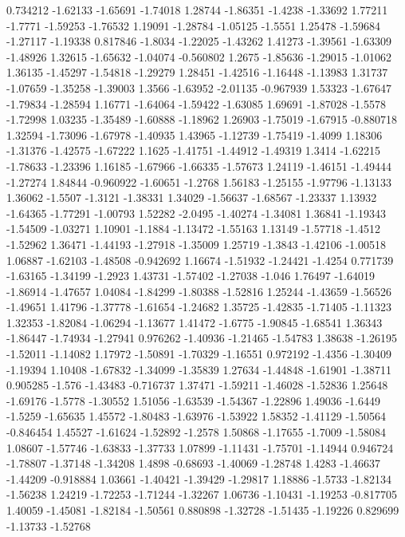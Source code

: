 \documentclass[9pt]{article}
\theoremstyle{plain}
\theoremstyle{definition}
\theoremstyle{remark}
\numberwithin{equation}{section}
\begin{document}
0.734212
-1.62133
-1.65691
-1.74018
1.28744
-1.86351
-1.4238
-1.33692
1.77211
-1.7771
-1.59253
-1.76532
1.19091
-1.28784
-1.05125
-1.5551
1.25478
-1.59684
-1.27117
-1.19338
0.817846
-1.8034
-1.22025
-1.43262
1.41273
-1.39561
-1.63309
-1.48926
1.32615
-1.65632
-1.04074
-0.560802
1.2675
-1.85636
-1.29015
-1.01062
1.36135
-1.45297
-1.54818
-1.29279
1.28451
-1.42516
-1.16448
-1.13983
1.31737
-1.07659
-1.35258
-1.39003
1.3566
-1.63952
-2.01135
-0.967939
1.53323
-1.67647
-1.79834
-1.28594
1.16771
-1.64064
-1.59422
-1.63085
1.69691
-1.87028
-1.5578
-1.72998
1.03235
-1.35489
-1.60888
-1.18962
1.26903
-1.75019
-1.67915
-0.880718
1.32594
-1.73096
-1.67978
-1.40935
1.43965
-1.12739
-1.75419
-1.4099
1.18306
-1.31376
-1.42575
-1.67222
1.1625
-1.41751
-1.44912
-1.49319
1.3414
-1.62215
-1.78633
-1.23396
1.16185
-1.67966
-1.66335
-1.57673
1.24119
-1.46151
-1.49444
-1.27274
1.84844
-0.960922
-1.60651
-1.2768
1.56183
-1.25155
-1.97796
-1.13133
1.36062
-1.5507
-1.3121
-1.38331
1.34029
-1.56637
-1.68567
-1.23337
1.13932
-1.64365
-1.77291
-1.00793
1.52282
-2.0495
-1.40274
-1.34081
1.36841
-1.19343
-1.54509
-1.03271
1.10901
-1.1884
-1.13472
-1.55163
1.13149
-1.57718
-1.4512
-1.52962
1.36471
-1.44193
-1.27918
-1.35009
1.25719
-1.3843
-1.42106
-1.00518
1.06887
-1.62103
-1.48508
-0.942692
1.16674
-1.51932
-1.24421
-1.4254
0.771739
-1.63165
-1.34199
-1.2923
1.43731
-1.57402
-1.27038
-1.046
1.76497
-1.64019
-1.86914
-1.47657
1.04084
-1.84299
-1.80388
-1.52816
1.25244
-1.43659
-1.56526
-1.49651
1.41796
-1.37778
-1.61654
-1.24682
1.35725
-1.42835
-1.71405
-1.11323
1.32353
-1.82084
-1.06294
-1.13677
1.41472
-1.6775
-1.90845
-1.68541
1.36343
-1.86447
-1.74934
-1.27941
0.976262
-1.40936
-1.21465
-1.54783
1.38638
-1.26195
-1.52011
-1.14082
1.17972
-1.50891
-1.70329
-1.16551
0.972192
-1.4356
-1.30409
-1.19394
1.10408
-1.67832
-1.34099
-1.35839
1.27634
-1.44848
-1.61901
-1.38711
0.905285
-1.576
-1.43483
-0.716737
1.37471
-1.59211
-1.46028
-1.52836
1.25648
-1.69176
-1.5778
-1.30552
1.51056
-1.63539
-1.54367
-1.22896
1.49036
-1.6449
-1.5259
-1.65635
1.45572
-1.80483
-1.63976
-1.53922
1.58352
-1.41129
-1.50564
-0.846454
1.45527
-1.61624
-1.52892
-1.2578
1.50868
-1.17655
-1.7009
-1.58084
1.08607
-1.57746
-1.63833
-1.37733
1.07899
-1.11431
-1.75701
-1.14944
0.946724
-1.78807
-1.37148
-1.34208
1.4898
-0.68693
-1.40069
-1.28748
1.4283
-1.46637
-1.44209
-0.918884
1.03661
-1.40421
-1.39429
-1.29817
1.18886
-1.5733
-1.82134
-1.56238
1.24219
-1.72253
-1.71244
-1.32267
1.06736
-1.10431
-1.19253
-0.817705
1.40059
-1.45081
-1.82184
-1.50561
0.880898
-1.32728
-1.51435
-1.19226
0.829699
-1.13733
-1.52768
\end{document}
